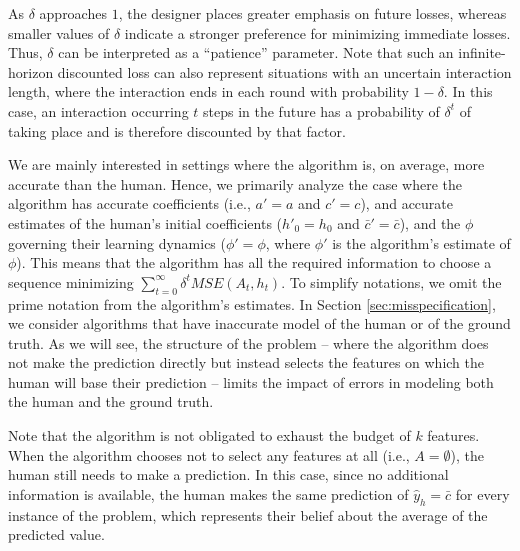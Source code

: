 As \( \delta \) approaches \( 1 \), the designer places greater emphasis on future losses, whereas smaller values of \( \delta \) indicate a stronger preference for minimizing immediate losses. Thus, \( \delta \) can be interpreted as a ``patience'' parameter. 
Note that such an infinite-horizon discounted loss can also represent situations with an 
uncertain interaction length, where the interaction ends in each round with probability \( 1 - \delta \). In this case, an interaction occurring \( t \) steps in the future has a probability of \( \delta^t \) of taking place and is therefore discounted by that factor.

We are mainly interested in settings where the algorithm is, on average, more accurate than the human. Hence, we primarily analyze the case where the algorithm has accurate coefficients (i.e., \( a' = a \) and $c'=c$), and accurate estimates of the human's initial coefficients (\( h'_0 = h_0 \) and $\bar c' = \bar c$), and the \( \phi \) governing their learning dynamics ($\phi'=\phi$, where $\phi'$ is the algorithm's estimate of $\phi$). This means that the algorithm has all the required information to choose a sequence minimizing \( \sum_{t=0}^\infty \delta^t  MSE(A_t,h_t) \). 
To simplify notations, we omit the prime notation from the algorithm's estimates.
In Section \ref{sec:misspecification}, we consider algorithms that have inaccurate model of the human or of the ground truth.
As we will see, the structure of the problem -- where the algorithm does not make the prediction directly but instead selects the features on which the human will base their prediction -- limits the impact of errors in modeling both the human and the ground truth.


Note that the algorithm is not obligated to exhaust the budget of $k$ features. When the algorithm chooses not to select any features at all (i.e., $A = \emptyset$), the human still needs to make a prediction. In this case, since no additional information is available, the human makes the same prediction of $\hat{y}_h = \bar c$ for every instance of the problem, which represents their belief about the average of the predicted value.





 